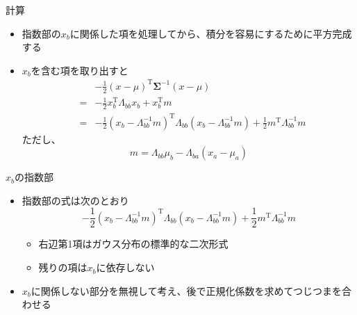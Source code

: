 \begin{frame}{計算}
 \begin{itemize}
  \item 指数部の$x_b$に関係した項を処理してから、積分を容易にするために平方完成する
  \item $x_b$を含む項を取り出すと
        \begin{eqnarray*}
         && -\frac{1}{2}(x - \mu)^{\mathrm{T}}\bm{\Sigma}^{-1}(x-\mu) \\
         &=&-\frac{1}{2}x^{\mathrm{T}}_b\Lambda_{bb}x_b+x^{\mathrm{T}}_bm \\
         &=& -\frac{1}{2}(x_b-\Lambda_{bb}^{-1}m)^{\mathrm{T}}\Lambda_{bb}(x_b-\Lambda_{bb}^{-1}m) + \frac{1}{2}m^{\mathrm{T}}\Lambda_{bb}^{-1}m
        \end{eqnarray*}
        ただし、
        \begin{equation*}
         m =  \Lambda_{bb}\mu_b - \Lambda_{ba}(x_a-\mu_a)
        \end{equation*}
 \end{itemize}
\end{frame}

\begin{frame}{$x_b$の指数部}
 \begin{itemize}
  \item 指数部の式は次のとおり
        \begin{equation}
         -\frac{1}{2}(x_b-\Lambda_{bb}^{-1}m)^{\mathrm{T}}\Lambda_{bb}(x_b-\Lambda_{bb}^{-1}m) + \frac{1}{2}m^{\mathrm{T}}\Lambda_{bb}^{-1}m
        \end{equation}
        \begin{itemize}
         \item 右辺第1項はガウス分布の標準的な二次形式
         \item 残りの項は$x_b$に依存しない
        \end{itemize}
  \item $x_b$に関係しない部分を無視して考え、後で正規化係数を求めてつじつまを合わせる
 \end{itemize}
\end{frame}


